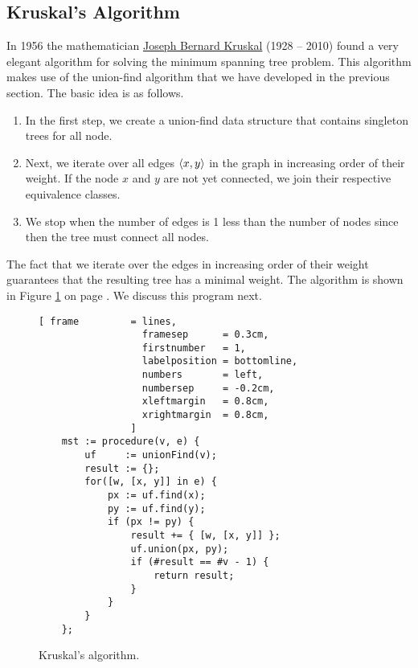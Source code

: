 \subsection{Kruskal's Algorithm}
In 1956 the mathematician \href{https://en.wikipedia.org/wiki/Joseph_Kruskal}{Joseph Bernard Kruskal} (1928 -- 2010) 
found a very elegant algorithm for solving the minimum spanning tree problem.   This algorithm makes use
of the union-find algorithm that we have developed in the previous section.  The basic idea is as
follows.
\begin{enumerate}
\item In the first step, we create a union-find data structure that contains singleton trees for all
      node.
\item Next, we iterate over all edges $\pair(x, y)$ in the graph in increasing order of their
      weight.  If the node $x$ and $y$ are not yet connected, we join their respective equivalence
      classes. 
\item We stop when the number of edges is 1 less than the number of nodes since then the tree must
      connect all nodes. 
\end{enumerate}
The fact that we iterate over the edges in increasing order of their weight guarantees that the
resulting tree has a minimal weight.
The algorithm is shown in Figure \ref{fig:kruskal.stlx} on page \pageref{fig:kruskal.stlx}.  We
discuss this program next. 

\begin{figure}[!ht]
\centering
\begin{Verbatim}[ frame         = lines, 
                  framesep      = 0.3cm, 
                  firstnumber   = 1,
                  labelposition = bottomline,
                  numbers       = left,
                  numbersep     = -0.2cm,
                  xleftmargin   = 0.8cm,
                  xrightmargin  = 0.8cm,
                ]
    mst := procedure(v, e) {
        uf     := unionFind(v);
        result := {};
        for([w, [x, y]] in e) {
            px := uf.find(x);
            py := uf.find(y);
            if (px != py) {
                result += { [w, [x, y]] };
                uf.union(px, py);
                if (#result == #v - 1) {
                    return result;
                }
            }
        }        
    };
\end{Verbatim}
\vspace*{-0.3cm}
\caption{Kruskal's algorithm.}
\label{fig:kruskal.stlx}
\end{figure}

